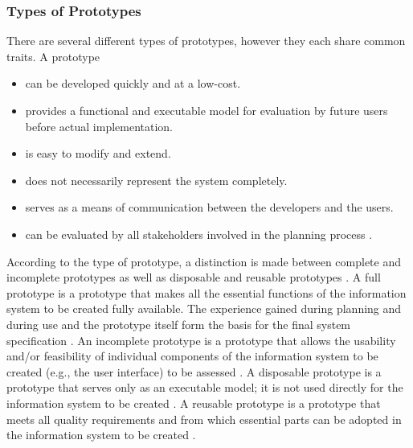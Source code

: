 \subsubsection*{Types of Prototypes}

There are several different types of prototypes,
however they each share common traits.
A prototype

\begin{itemize}
	\item can be developed quickly and at a low-cost.
	\item provides a functional and executable model for evaluation by future users before actual implementation.
	\item is easy to modify and extend.
	\item does not necessarily represent the system completely.
	\item serves as a means of communication between the developers and the users.
	\item can be evaluated by all stakeholders involved in the planning process \autocite{riedlManagementInformatik2019}.
\end{itemize}

According to the type of prototype, a distinction is made between complete and incomplete prototypes
as well as disposable and reusable prototypes
\autocite{riedlManagementInformatik2019}.
A full prototype is a prototype that makes all the essential functions of the information system to be created fully available.
The experience gained during planning and during use and the prototype itself form the basis for the final system specification
\autocite{riedlManagementInformatik2019}.
An incomplete prototype is a prototype that allows the usability and/or feasibility of individual components
of the information system to be created (e.g., the user interface) to be assessed
\autocite{riedlManagementInformatik2019}.
A disposable prototype is a prototype that serves only as an executable model;
it is not used directly for the information system to be created
\autocite{riedlManagementInformatik2019}.
A reusable prototype is a prototype that meets all quality requirements and from which
essential parts can be adopted in the information system to be created
\autocite{riedlManagementInformatik2019}.

%

